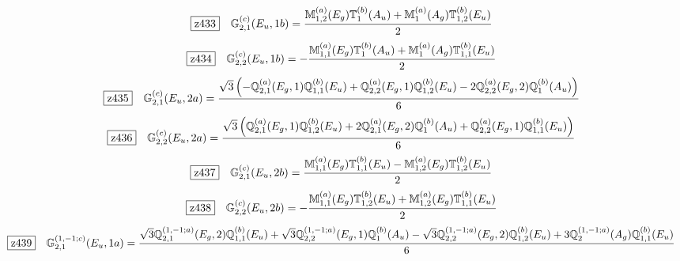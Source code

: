 \documentclass[fleqn,10pt,landscape]{jsarticle}
\begin{document}
\begin{dmath*}
\hspace*{3mm}\fbox{z433}\quad \mathbb{G}_{2,1}^{(c)}(E_{u},1b)=\frac{\mathbb{M}_{1,2}^{(a)}(E_{g}) \mathbb{T}_{1}^{(b)}(A_{u}) + \mathbb{M}_{1}^{(a)}(A_{g}) \mathbb{T}_{1,2}^{(b)}(E_{u})}{2}
\end{dmath*}
\begin{dmath*}
\hspace*{3mm}\fbox{z434}\quad \mathbb{G}_{2,2}^{(c)}(E_{u},1b)=- \frac{\mathbb{M}_{1,1}^{(a)}(E_{g}) \mathbb{T}_{1}^{(b)}(A_{u}) + \mathbb{M}_{1}^{(a)}(A_{g}) \mathbb{T}_{1,1}^{(b)}(E_{u})}{2}
\end{dmath*}
\begin{dmath*}
\hspace*{3mm}\fbox{z435}\quad \mathbb{G}_{2,1}^{(c)}(E_{u},2a)=\frac{\sqrt{3} \left(- \mathbb{Q}_{2,1}^{(a)}(E_{g},1) \mathbb{Q}_{1,1}^{(b)}(E_{u}) + \mathbb{Q}_{2,2}^{(a)}(E_{g},1) \mathbb{Q}_{1,2}^{(b)}(E_{u}) - 2 \mathbb{Q}_{2,2}^{(a)}(E_{g},2) \mathbb{Q}_{1}^{(b)}(A_{u})\right)}{6}
\end{dmath*}
\begin{dmath*}
\hspace*{3mm}\fbox{z436}\quad \mathbb{G}_{2,2}^{(c)}(E_{u},2a)=\frac{\sqrt{3} \left(\mathbb{Q}_{2,1}^{(a)}(E_{g},1) \mathbb{Q}_{1,2}^{(b)}(E_{u}) + 2 \mathbb{Q}_{2,1}^{(a)}(E_{g},2) \mathbb{Q}_{1}^{(b)}(A_{u}) + \mathbb{Q}_{2,2}^{(a)}(E_{g},1) \mathbb{Q}_{1,1}^{(b)}(E_{u})\right)}{6}
\end{dmath*}
\begin{dmath*}
\hspace*{3mm}\fbox{z437}\quad \mathbb{G}_{2,1}^{(c)}(E_{u},2b)=\frac{\mathbb{M}_{1,1}^{(a)}(E_{g}) \mathbb{T}_{1,1}^{(b)}(E_{u}) - \mathbb{M}_{1,2}^{(a)}(E_{g}) \mathbb{T}_{1,2}^{(b)}(E_{u})}{2}
\end{dmath*}
\begin{dmath*}
\hspace*{3mm}\fbox{z438}\quad \mathbb{G}_{2,2}^{(c)}(E_{u},2b)=- \frac{\mathbb{M}_{1,1}^{(a)}(E_{g}) \mathbb{T}_{1,2}^{(b)}(E_{u}) + \mathbb{M}_{1,2}^{(a)}(E_{g}) \mathbb{T}_{1,1}^{(b)}(E_{u})}{2}
\end{dmath*}
\begin{dmath*}
\hspace*{3mm}\fbox{z439}\quad \mathbb{G}_{2,1}^{(1,-1;c)}(E_{u},1a)=\frac{\sqrt{3} \mathbb{Q}_{2,1}^{(1,-1;a)}(E_{g},2) \mathbb{Q}_{1,1}^{(b)}(E_{u}) + \sqrt{3} \mathbb{Q}_{2,2}^{(1,-1;a)}(E_{g},1) \mathbb{Q}_{1}^{(b)}(A_{u}) - \sqrt{3} \mathbb{Q}_{2,2}^{(1,-1;a)}(E_{g},2) \mathbb{Q}_{1,2}^{(b)}(E_{u}) + 3 \mathbb{Q}_{2}^{(1,-1;a)}(A_{g}) \mathbb{Q}_{1,1}^{(b)}(E_{u})}{6}
\end{dmath*}
\end{document}
